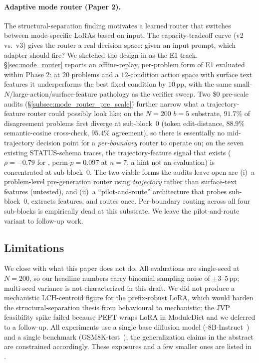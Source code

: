 \paragraph{Adaptive mode router (Paper 2).}  The
structural-separation finding motivates a learned router that
switches between mode-specific LoRAs based on input.  The
capacity-tradeoff curve (v2 vs.\ v3) gives the router a real
decision space: given an input prompt, which adapter should fire?
We sketched the design in  as the E1 track.
\S\ref{sec:mode_router} reports an offline-replay, per-problem
form of E1 evaluated within Phase 2: at $20$ problems and a
$12$-condition action space with surface text features it
underperforms the best fixed condition by $10$\,pp, with the same
small-$N$/large-action/surface-feature pathology as the verifier
sweep.  Two \$0 pre-scale audits
(\S\ref{subsec:mode_router_pre_scale}) further narrow what a
trajectory-feature router could possibly look like: on the
$N{=}200$ \cmaj{} $b{=}5$ substrate, $91.7\%$ of disagreement
problems first diverge at sub-block~$0$ (token edit-distance,
$88.9\%$ semantic-cosine cross-check, $95.4\%$ agreement), so
there is essentially no mid-trajectory decision point for a
\emph{per-boundary} router to operate on; on the seven existing
STATUS-schema traces, the trajectory-feature signal that exists
($\rho{=}{-}0.79$ for , perm-$p{=}0.097$ at
$n{=}7$, a hint not an evaluation) is concentrated at
sub-block~$0$.  The two viable forms the audits leave open are
(i)~a problem-level pre-generation router using
\emph{trajectory} rather than surface-text features (untested),
and (ii)~a ``pilot-and-route'' architecture that probes
sub-block~$0$, extracts features, and routes once.  Per-boundary
routing across all four sub-blocks is empirically dead at this
substrate.  We leave the pilot-and-route variant to follow-up
work.

\subsection{Limitations}

We close with what this paper does not do.  All evaluations are
single-seed at $N{=}200$, so our headline numbers carry binomial
sampling noise of $\pm 3$--$5$\,pp; multi-seed variance is not
characterized in this draft.  We did not produce a mechanistic
LCH-centroid figure for the
prefix-robust LoRA, which would harden the structural-separation
thesis from behavioural to mechanistic; the JVP feasibility spike
failed because PEFT wraps LoRA in
 ModuleDict and we deferred to a
follow-up.  All experiments use a single base diffusion model
(\LLaDA{}-8B-Instruct~\citep{nie2025llada}) and a single
benchmark (GSM8K-test~\citep{cobbe2021gsm8k}); the
generalization claims in the abstract are constrained
accordingly.  These exposures and a few smaller ones are listed in
.
